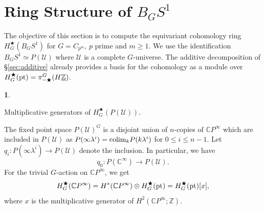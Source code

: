 \documentclass[a4paper,leqno,11pt]{amsart}
\theoremstyle{plain}
\theoremstyle{definition}
\newtheorem{subsec}[theorem]{}
\theoremstyle{remark}
\theoremstyle{definition}
\newcommand{\C}{{\mathbb C}}
\newcommand{\Z}{{\mathbb{Z}}}
\newenvironment{myeq}[1][]
{\stepcounter{theorem}\begin{equation}\tag{\thetheorem}{#1}}
	{\end{equation}}
\newenvironment{mysubsection}[2][]
{\begin{subsec}\begin{upshape}\begin{bfseries}{#2.}
			\end{bfseries}{#1}}
		{\end{upshape}\end{subsec}}
\newcommand{\uZ}{\underline{\mathbb{Z}}}
\def\Z{\mathbb{Z}}
\def\sU{\mathcal{U}}
\def\C{\mathbb{C}}
\numberwithin{equation}{section}
\newcommand{\pt}{\textup{pt}}
\begin{document}
	\section{Ring Structure of $ B_{G}S^1$}\label{cohring}
	The objective of this section is to compute the equivariant cohomology ring $ H^\bigstar_G(B_GS^1) $ for $ G=C_{p^m} $, $ p $ prime and $ m\ge 1 $. We use the identification $ B_GS^1\simeq P(\mathcal{U}) $ where $ \mathcal{ U} $ is a complete $ G $-universe. The additive decomposition of \S \ref{sec:additive} already provides a basis for the cohomology as a module over $ H^\bigstar_G(\pt)=\pi_{-\bigstar}^G(H\uZ) $. 
	\begin{mysubsection}{Multiplicative generators of $H^{\bigstar}_{G}(P(\mathcal{U}))$} The fixed point space $ P(\mathcal{U})^G $ is a disjoint union of $ n $-copies of $ \C P^\infty $ which are included in $ P(\mathcal{U}) $ as $ P(\infty \lambda^i)=\textup{colim}_k P(k\lambda^i) $ for $ 0\le i\le n-1 $.
		Let $q_i :P(\infty \lambda^i) \rightarrow P(\mathcal{U})$ denote the inclusion. 
		In particular, we have 
		\begin{myeq}\label{eq:q0}
			q_0 :P(\mathbb{C}^{\infty})\rightarrow P(\sU).
		\end{myeq}
		For the trivial $ G $-action on $\mathbb{C}P^{\infty}$, we get
		$$H^{\bigstar}_{G}(\mathbb{C}P^{\infty})= H^{*}(\mathbb{C}P^{\infty})\otimes H^{\bigstar}_{G}(\pt) =H^{\bigstar}_{G}(\pt)[x],$$
		where $x$ is the multiplicative  generator of $H^{2}(\C P^{\infty};\Z)$.


\end{mysubsection}
\end{document}
